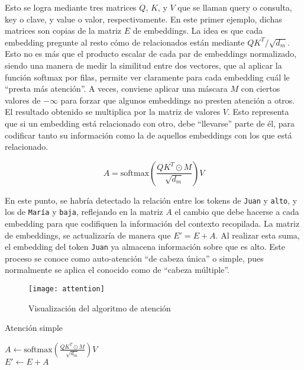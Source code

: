 				Esto se logra mediante tres matrices $Q$, $K$, y $V$ que se llaman query o consulta, key o clave, y value o valor, respectivamente. En este primer ejemplo, dichas matrices son copias de la matriz $E$ de embeddings. La idea es que cada embedding pregunte al resto cómo de relacionados están mediante $QK^T/\sqrt{d_m}$. Esto no es más que el producto escalar de cada par de embeddings normalizado, siendo una manera de medir la similitud entre dos vectores, que al aplicar la función softmax por filas, permite ver claramente para cada embedding cuál le ``presta más atención''. A veces, conviene aplicar una máscara $M$ con ciertos valores de $-\infty$ para forzar que algunos embeddings no presten atención a otros. El resultado obtenido se multiplica por la matriz de valores $V$. Esto representa que si un embedding está relacionado con otro, debe ``llevarse'' parte de él, para codificar tanto su información como la de aquellos embeddings con los que está relacionado. 
				
				$$
				A = \text{softmax}\left(\frac{QK^T\odot M}{\sqrt{d_m}}\right)V
				$$
				
				En este punto, se habría detectado la relación entre los tokens de \texttt{Juan} y \texttt{alto}, y los de \texttt{María} y \texttt{baja}, reflejando en la matriz $A$ el cambio que debe hacerse a cada embedding para que codifiquen la información del contexto recopilada. La matriz de embeddings, se actualizaría de manera que $E' = E + A$. Al realizar esta suma, el embedding del token \texttt{Juan} ya almacena información sobre que es alto. Este proceso se conoce como auto-atención ``de cabeza única'' o simple, pues normalmente se aplica el conocido como de ``cabeza múltiple''. \\
				
				\begin{figure}[!h]
					\centering
					\texttt{[image: attention]}
					\caption{Visualización del algoritmo de atención \cite{attention}}
					\label{fig:attention}
				\end{figure}
				
				\begin{algorithm}
					\DontPrintSemicolon
					
					\caption{Atención simple}
					\label{algo:attention_simple}
					
					
					$A \gets \text{softmax}\left(\frac{QK^T\odot M}{\sqrt{d_m}}\right)V$\\
					$E' \gets E + A$
				\end{algorithm}
				
